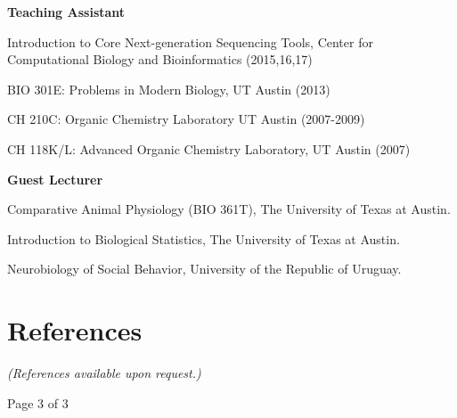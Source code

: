 \documentclass[margin,line]{resume}
\begin{document}
\begin{resume}
{\bf Teaching Assistant}
\begin{list1}
\item[] Introduction to Core Next-generation Sequencing Tools, Center for Computational Biology and Bioinformatics (2015,16,17)
\item[] BIO 301E: Problems in Modern Biology, UT Austin (2013)
\item[] CH 210C: Organic Chemistry Laboratory UT Austin (2007-2009)
\item[] CH 118K/L: Advanced Organic Chemistry Laboratory, UT Austin (2007)
\end{list1}

{\bf Guest Lecturer}
\begin{list1}
\item[] Comparative Animal Physiology (BIO 361T), The University of Texas at Austin. 
\item[] Introduction to Biological Statistics, The University of Texas at Austin.  
\item[] Neurobiology of Social Behavior, University of the Republic of Uruguay. 
\end{list1}

\section{\mysidestyle References}

{\em (References available upon request.)}


\vspace{3cm}
{\centerline {Page 3 of 3}}

\end{resume}
\end{document}
